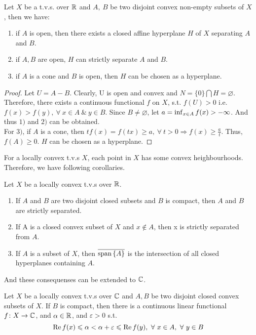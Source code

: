 \documentclass[a4paper,11pt]{report}
\begin{document}
\begin{thm}
	Let $X$ be a t.v.s. over $\mathbb{R}$ and $A,~ B$ be two disjoint convex non-empty subsets of $X$, then we have:
	\begin{enumerate}[label=\arabic*)]
		\item if $A$ is open, then there exists a closed affine hyperplane $H$ of $X$ separating $A$ and $B$.
		\item if $A, B$ are open, $H$ can strictly separate $A$ and $B$.
		\item if $A$ is a cone and $B$ is open, then $H$ can be chosen as a hyperplane.
	\end{enumerate}
\end{thm}
\begin{proof}
	Let $U=A-B$. Clearly, U is open and convex and $N=\{0\} \bigcap H = \varnothing$. Therefore, there exists a continuous functional $f$ on $X$, s.t. $f(U) > 0$ i.e. $f(x) > f(y),~ \forall~ x \in A ~\&~ y \in B$. Since $B \neq \varnothing$, let $a = \operatorname{inf}_{x \in A} f(x) > -\infty$. And thus $1)$ and $2)$ can be obtained. \\
	For $3)$, if $A$ is a cone, then $tf(x) = f(tx) \geqslant a,~ \forall~ t > 0 \Rightarrow f(x) \geqslant \frac{a}{t}$. Thus, $f(A) \geqslant 0$. $H$ can be chosen as a hyperplane. 
\end{proof}

For a locally convex t.v.s $X$, each point in $X$ has some convex heighbourhoods. Therefore, we have following corollaries.

\begin{cor} \label{cor2}
	Let $X$ be a locally convex t.v.s over $\mathbb{R}$.
	\begin{enumerate}[label=\arabic*)]
		\item If $A$ and $B$ are two disjoint closed subsets and $B$ is compact, then $A$ and $B$ are strictly separated.
		\item If A is a closed convex subset of $X$ and $x \notin A$, then x is strictly separated from $A$.
		\item If $A$ is a subset of $X$, then $\overline{\operatorname{span}{\{A\}}}$ is the intersection of all closed hyperplanes containing $A$.
	\end{enumerate}
\end{cor}

And these consequenses can be extended to $\mathbb{C}$.

\begin{thm} \label{thm3}
	Let $X$ be a locally convex t.v.s over $\mathbb{C}$ and $A,B$ be two disjoint closed convex subsets of $X$. If $B$ is compact, then there is a continuous linear functional $f \colon X \rightarrow \mathbb{C}$, and $\alpha \in \mathbb{R}$, and $\varepsilon > 0$ s.t.
	\begin{equation*}
		\operatorname{Re}{f(x)} \leqslant \alpha < \alpha +\varepsilon \leqslant \operatorname{Re}{f(y)},~ \forall~ x \in A,~ \forall~ y \in B
	\end{equation*} 
\end{thm}
\end{document}
